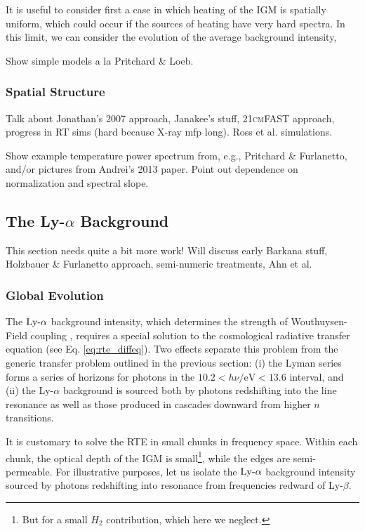 It is useful to consider first a case in which heating of the IGM is spatially uniform, which could occur if the sources of heating have very hard spectra. In this limit, we can consider the evolution of the average background intensity,

{\color{red} Show simple models a la Pritchard \& Loeb.}



\subsubsection{Spatial Structure} \label{sec:temperature_local}
Talk about Jonathan's 2007 approach, Janakee's stuff, \textsc{21cmFAST} approach, progress in RT sims (hard because X-ray mfp long). Ross et al. simulations.

{\color{red} Show example temperature power spectrum from, e.g., Pritchard \& Furlanetto, and/or pictures from Andrei's 2013 paper. Point out dependence on normalization and spectral slope.}


\subsection{The Ly-$\alpha$ Background}
{\color{red} This section needs quite a bit more work! Will discuss early Barkana stuff, Holzbauer \& Furlanetto approach, semi-numeric treatments, Ahn et al.}


\subsubsection{Global Evolution}
The $\text{Ly-}\alpha$ background intensity, which determines the strength of Wouthuysen-Field coupling \cite{Wouthuysen1952, Field1958}, requires a special solution to the cosmological radiative transfer equation (see Eq. \ref{eq:rte_diffeq}). Two effects separate this problem from the generic transfer problem outlined in the previous section: (i) the Lyman series forms a series of horizons for photons in the $10.2 < h \nu / \mathrm{eV} < 13.6$ interval, and (ii) the Ly-$\alpha$ background is sourced both by photons redshifting into the line resonance as well as those produced in cascades downward from higher $n$ transitions.

It is customary to solve the RTE in small chunks in frequency space. Within each chunk, the optical depth of the IGM is small\footnote{But for a small $H_2$ contribution, which here we neglect.}, while the edges are semi-permeable. For illustrative purposes, let us isolate the $\text{Ly-}\alpha$ background intensity sourced by photons redshifting into resonance from frequencies redward of Ly-$\beta$.


